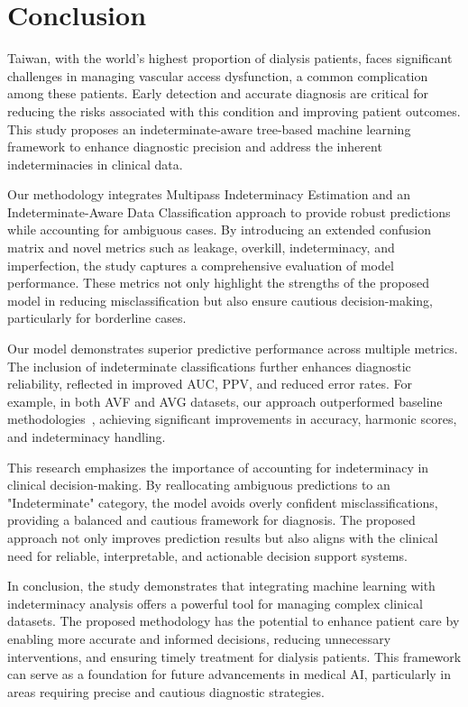 \chapter{Conclusion}
\label{chapter:fig}
Taiwan, with the world's highest proportion of dialysis patients, faces significant challenges in managing vascular access dysfunction, a common complication among these patients. Early detection and accurate diagnosis are critical for reducing the risks associated with this condition and improving patient outcomes. This study proposes an indeterminate-aware tree-based machine learning framework to enhance diagnostic precision and address the inherent indeterminacies in clinical data.

Our methodology integrates Multipass Indeterminacy Estimation and an Indeterminate-Aware Data Classification approach to provide robust predictions while accounting for ambiguous cases. By introducing an extended confusion matrix and novel metrics such as leakage, overkill, indeterminacy, and imperfection, the study captures a comprehensive evaluation of model performance. These metrics not only highlight the strengths of the proposed model in reducing misclassification but also ensure cautious decision-making, particularly for borderline cases.

Our model demonstrates superior predictive performance across multiple metrics. The inclusion of indeterminate classifications further enhances diagnostic reliability, reflected in improved AUC, PPV, and reduced error rates. For example, in both AVF and AVG datasets, our approach outperformed baseline methodologies~\cite{Wu}, achieving significant improvements in accuracy, harmonic scores, and indeterminacy handling.

This research emphasizes the importance of accounting for indeterminacy in clinical decision-making. By reallocating ambiguous predictions to an "Indeterminate" category, the model avoids overly confident misclassifications, providing a balanced and cautious framework for diagnosis. The proposed approach not only improves prediction results but also aligns with the clinical need for reliable, interpretable, and actionable decision support systems.

In conclusion, the study demonstrates that integrating machine learning with indeterminacy analysis offers a powerful tool for managing complex clinical datasets. The proposed methodology has the potential to enhance patient care by enabling more accurate and informed decisions, reducing unnecessary interventions, and ensuring timely treatment for dialysis patients. This framework can serve as a foundation for future advancements in medical AI, particularly in areas requiring precise and cautious diagnostic strategies.